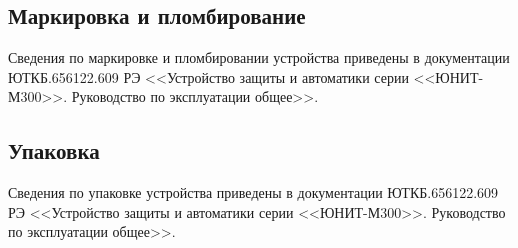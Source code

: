 \color{uniblue}\subsection{Маркировка и пломбирование}\color{black}
Сведения по маркировке и пломбировании устройства приведены в документации ЮТКБ.656122.609 РЭ <<Устройство защиты и автоматики серии <<ЮНИТ-М300>>. Руководство по эксплуатации общее>>.

\color{uniblue}\subsection{Упаковка}\color{black}
Сведения по упаковке устройства приведены в документации ЮТКБ.656122.609 РЭ <<Устройство защиты и автоматики серии <<ЮНИТ-М300>>. Руководство по эксплуатации общее>>.
